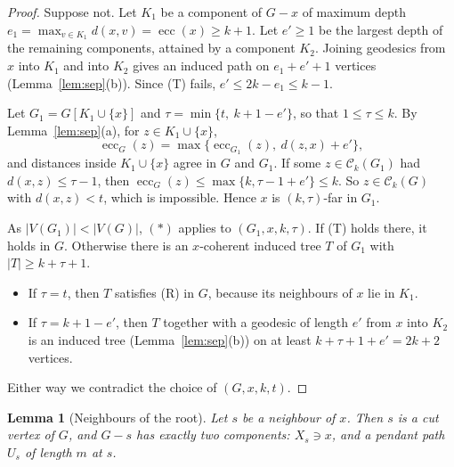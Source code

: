 \documentclass[11pt,a4paper]{article}
\newtheorem{lemma}[theorem]{Lemma}
\theoremstyle{remark}
\newcommand{\ecc}{\operatorname{ecc}}
\newcommand{\C}{\mathcal C}
\begin{document}
\begin{proof}
Suppose not. Let $K_1$ be a component of $G-x$ of maximum depth $e_1=\max_{v\in K_1}d(x,v)=\ecc(x)\ge k+1$. Let $e'\ge1$ be the largest depth of the remaining components, attained by a component $K_2$. Joining geodesics from $x$ into $K_1$ and into $K_2$ gives an induced path on $e_1+e'+1$ vertices (Lemma~\ref{lem:sep}(b)). Since (T) fails, $e'\le 2k-e_1\le k-1$.

Let $G_1=G[K_1\cup\{x\}]$ and $\tau=\min\{t,\ k+1-e'\}$, so that $1\le\tau\le k$. By Lemma~\ref{lem:sep}(a), for $z\in K_1\cup\{x\}$,
\[
\ecc_G(z)=\max\{\ecc_{G_1}(z),\ d(z,x)+e'\},
\]
and distances inside $K_1\cup\{x\}$ agree in $G$ and $G_1$. If some $z\in\C_k(G_1)$ had $d(x,z)\le\tau-1$, then $\ecc_G(z)\le\max\{k,\tau-1+e'\}\le k$. So $z\in\C_k(G)$ with $d(x,z)<t$, which is impossible. Hence $x$ is $(k,\tau)$-far in $G_1$.

As $|V(G_1)|<|V(G)|$, $(\ast)$ applies to $(G_1,x,k,\tau)$. If (T) holds there, it holds in $G$. Otherwise there is an $x$-coherent induced tree $T$ of $G_1$ with $|T|\ge k+\tau+1$.
\begin{itemize}
\item If $\tau=t$, then $T$ satisfies (R) in $G$, because its neighbours of $x$ lie in $K_1$.
\item If $\tau=k+1-e'$, then $T$ together with a geodesic of length $e'$ from $x$ into $K_2$ is an induced tree (Lemma~\ref{lem:sep}(b)) on at least $k+\tau+1+e'=2k+2$ vertices.
\end{itemize}
Either way we contradict the choice of $(G,x,k,t)$.
\end{proof}

\begin{lemma}[Neighbours of the root]\label{lem:nbrs}
Let $s$ be a neighbour of $x$. Then $s$ is a cut vertex of $G$, and $G-s$ has exactly two components: $X_s\ni x$, and a pendant path $U_s$ of length $m$ at $s$.
\end{lemma}
\end{document}
